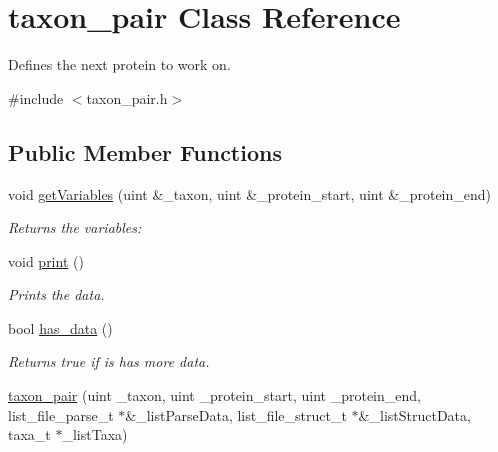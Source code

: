 \hypertarget{classtaxon__pair}{
\section{taxon\_\-pair Class Reference}
\label{classtaxon__pair}
}


Defines the next protein to work on.  




{\ttfamily \#include $<$taxon\_\-pair.h$>$}

\subsection*{Public Member Functions}
\begin{DoxyCompactItemize}
\item 
\hypertarget{classtaxon__pair_a34d3144d235a6bef94e11e1b1b361a28}{
void \hyperlink{classtaxon__pair_a34d3144d235a6bef94e11e1b1b361a28}{getVariables} (uint \&\_\-taxon, uint \&\_\-protein\_\-start, uint \&\_\-protein\_\-end)}
\label{classtaxon__pair_a34d3144d235a6bef94e11e1b1b361a28}

\begin{DoxyCompactList}\small\item\em Returns the variables: \end{DoxyCompactList}\item 
\hypertarget{classtaxon__pair_ad402573e45c101790abc5a0dc3b5b246}{
void \hyperlink{classtaxon__pair_ad402573e45c101790abc5a0dc3b5b246}{print} ()}
\label{classtaxon__pair_ad402573e45c101790abc5a0dc3b5b246}

\begin{DoxyCompactList}\small\item\em Prints the data. \end{DoxyCompactList}\item 
\hypertarget{classtaxon__pair_a22bdca67459d108f10cabc30982dae63}{
bool \hyperlink{classtaxon__pair_a22bdca67459d108f10cabc30982dae63}{has\_\-data} ()}
\label{classtaxon__pair_a22bdca67459d108f10cabc30982dae63}

\begin{DoxyCompactList}\small\item\em Returns true if is has more data. \end{DoxyCompactList}\item 
\hypertarget{classtaxon__pair_a92d8c30fa7e3f97068ceb22dd3219f96}{
\hyperlink{classtaxon__pair_a92d8c30fa7e3f97068ceb22dd3219f96}{taxon\_\-pair} (uint \_\-taxon, uint \_\-protein\_\-start, uint \_\-protein\_\-end, list\_\-file\_\-parse\_\-t $\ast$\&\_\-listParseData, list\_\-file\_\-struct\_\-t $\ast$\&\_\-listStructData, taxa\_\-t $\ast$\_\-listTaxa)}
\label{classtaxon__pair_a92d8c30fa7e3f97068ceb22dd3219f96}


\end{DoxyCompactItemize}

